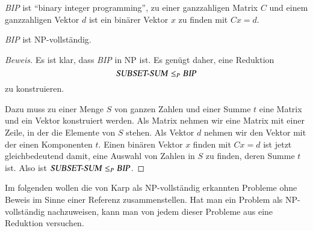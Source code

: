 \textsl{BIP} ist ``binary integer programming'', zu einer ganzzahligen
Matrix $C$ und einem ganzzahligen Vektor $d$ ist ein binärer
Vektor $x$ zu finden mit $Cx=d$.

\begin{satz}
\textsl{BIP} ist NP-vollständig.
\end{satz}

\begin{proof}[Beweis]
Es ist klar, dass \textsl{BIP} in NP ist. Es genügt daher, eine
Reduktion
\[
\text{\textsl{SUBSET-SUM}}\le_P\text{\textsl{BIP}}
\]
zu konstruieren.

Dazu muss zu einer Menge $S$ von ganzen Zahlen und einer Summe $t$
eine Matrix und ein Vektor konstruiert werden. Als Matrix nehmen wir
eine Matrix mit einer Zeile, in der die Elemente von $S$ stehen. Als
Vektor $d$ nehmen wir den Vektor mit der einen Komponenten $t$.
Einen binären Vektor $x$ finden mit $Cx=d$ ist jetzt gleichbedeutend
damit, eine Auswahl von Zahlen in $S$ zu finden, deren Summe $t$ ist.
Also ist
$\text{\textsl{SUBSET-SUM}}\le_P\text{\textsl{BIP}}$.
\end{proof}

Im folgenden wollen die von Karp als NP-vollständig erkannten Probleme
ohne Beweis im Sinne einer Referenz zusammenstellen. Hat man ein
Problem als NP-vollständig nachzuweisen, kann man von jedem dieser
Probleme aus eine Reduktion versuchen.

